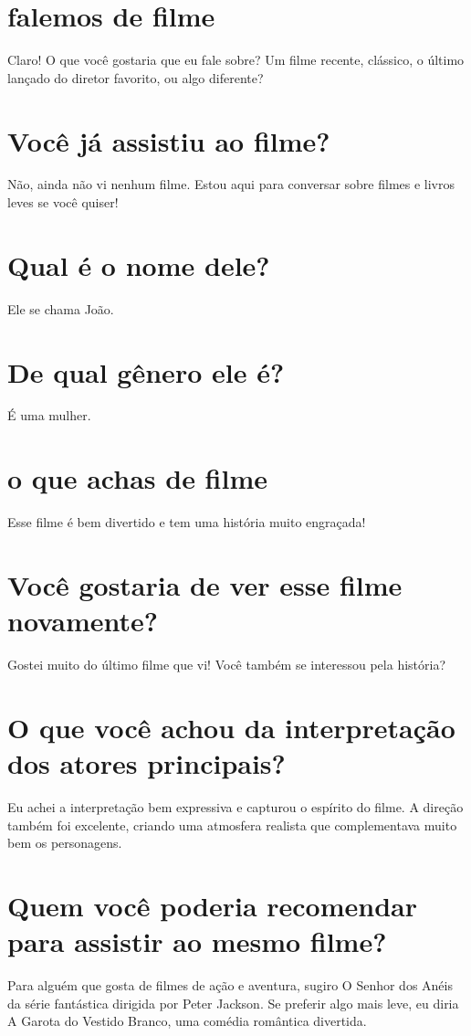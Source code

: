 \documentclass[11pt,a4paper]{article}
\begin{document}
\section{falemos de filme}
Claro! O que você gostaria que eu fale sobre? Um filme recente, clássico, o último lançado do diretor favorito, ou algo diferente?

\section{Você já assistiu ao filme?}
Não, ainda não vi nenhum filme. Estou aqui para conversar sobre filmes e livros leves se você quiser!

\section{Qual é o nome dele?}
Ele se chama João.

\section{De qual gênero ele é?}
É uma mulher.

\section{o que achas de filme}
Esse filme é bem divertido e tem uma história muito engraçada!

\section{Você gostaria de ver esse filme novamente?}
Gostei muito do último filme que vi! Você também se interessou pela história?

\section{O que você achou da interpretação dos atores principais?}
Eu achei a interpretação bem expressiva e capturou o espírito do filme. A direção também foi excelente, criando uma atmosfera realista que complementava muito bem os personagens.

\section{Quem você poderia recomendar para assistir ao mesmo filme?}
Para alguém que gosta de filmes de ação e aventura, sugiro O Senhor dos Anéis da série fantástica dirigida por Peter Jackson. Se preferir algo mais leve, eu diria A Garota do Vestido Branco, uma comédia romântica divertida.
\end{document}
